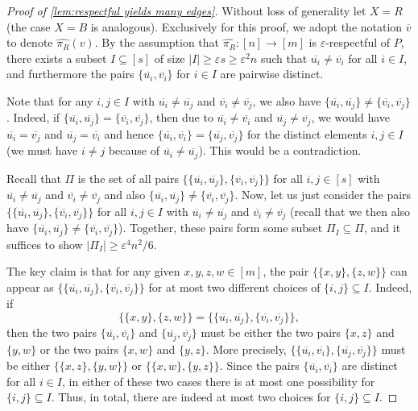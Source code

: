 \documentclass[11pt,reqno,oneside]{amsart}
\theoremstyle{definition}
\newcommand\ol[1]{\overline{#1}}
\newcommand\wh[1]{\widehat{#1}}
\newcommand\1{\mathbf{1}}
\newcommand{\su}{\subseteq}
\newcommand{\eps}{\varepsilon}
\let\geq\geqslant
\begin{document}
\begin{proof}[Proof of \cref{lem:respectful yields many edges}] Without loss of generality let $X=R$ (the case $X=B$ is analogous). Exclusively for this proof, we adopt the notation $\ol v$ to denote $\wh{\pi_R}(v)$. By the assumption that $\wh{\pi_R}:[n] \to [m]$ is $\varepsilon$-respectful of $P$, there exists a subset $I\su [s]$ of size $|I|\geq \eps s\geq \eps^2n$ 
such that $\ol{u_i} \neq \ol{v_i}$ for all $i \in I$, and furthermore the pairs $\{\ol{u_i},\ol{v_i}\}$ for $ i\in I$ are pairwise distinct. 

Note that for any $i,j\in I$ with $\ol{u_i}\ne\ol{u_j}$ and $\ol{v_i}\ne\ol{v_j}$, we also have
$\{\ol{u_i},\ol{u_j}\}\ne \{\ol{v_i},\ol{v_j}\}$.
Indeed, if $\{\ol{u_i},\ol{u_j}\}= \{\ol{v_i},\ol{v_j}\}$, then due to
$\ol{u_i}\ne \ol{v_i}$ and $\ol{u_j}\ne\ol{v_j}$, we would have
$\ol{u_i}=\ol{v_j}$ and $\ol{u_j}=\ol{v_i}$ and hence
$\{\ol{u_i},\ol{v_i}\}=\{\ol{u_j},\ol{v_j}\}$
for the distinct elements $i,j\in I$
(we must have $i\ne j$ because of $\ol{u_i}\ne\ol{u_j}$).
This would be a contradiction.

Recall that $\Pi$ is the set of all pairs $\big\{\{\ol{u_i},\ol{u_j}\}, \{\ol{v_i},\ol{v_j}\}\big\}$ for all $i,j\in [s]$ with $\ol{u_i}\ne \ol{u_j}$ and $\ol{v_i}\ne \ol{v_j}$ and also $\{\ol{u_i},\ol{u_j}\}\ne \{\ol{v_i},\ol{v_j}\}$. Now, let us just consider the pairs
$\{\{\ol{u_i},\ol{u_j}\}, \{\ol{v_i},\ol{v_j}\}\}$
for all $i,j\in I$ with $\ol{u_i}\ne\ol{u_j}$ and $\ol{v_i}\ne\ol{v_j}$ (recall that we then also have $\{\ol{u_i},\ol{u_j}\}\ne \{\ol{v_i},\ol{v_j}\}$). Together, these pairs form some subset $\Pi_I\su \Pi$,
and it suffices to show $|\Pi_I|\geq \eps^4 n^2/6$.

The key claim is that for any given $x,y,z,w\in [m]$, the pair
$\{\{x,y\}, \{z,w\}\}$
can appear as
$\{\{\ol{u_i},\ol{u_j}\}, \{\ol{v_i},\ol{v_j}\}\}$
for at most two different choices of $\{i,j\}\su I$.
Indeed, if
\[
\big\{\{x,y\}, \{z,w\}\big\}
=
\big\{\{\ol{u_i},\ol{u_j}\}, \{\ol{v_i},\ol{v_j}\}\big\},
\]
then the two pairs $\{\ol{u_i},\ol{v_i}\}$ and $\{\ol{u_j},\ol{v_j}\}$
must be either the two pairs $\{x,z\}$ and $\{y,w\}$ or the two pairs
$\{x,w\}$ and $\{y,z\}$.
More precisely,
$\{\{\ol{u_i},\ol{v_i}\}, \{\ol{u_j},\ol{v_j}\}\}$
must be either $\{\{x,z\}, \{y,w\}\}$ or $\{\{x,w\}, \{y,z\}
\}$.
Since the pairs $\{\ol{u_i},\ol{v_i}\}$ are distinct for all $i\in I$,
in either of these two cases there is at most one possibility for
$\{i,j\}\su I$.
Thus, in total, there are indeed at most two choices for $\{i,j\}\su I$.


\end{proof}
\end{document}
